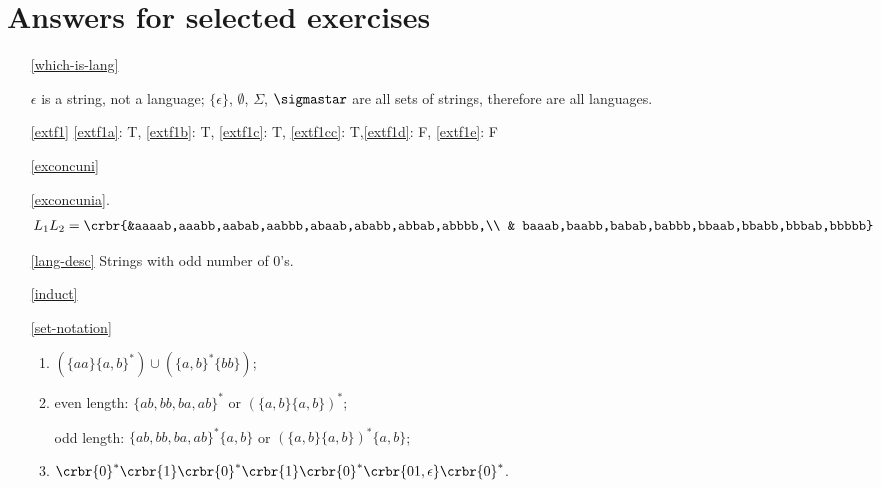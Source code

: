 \documentclass[11pt]{article}
\newcommand{\emptystring}{\ensuremath{\epsilon}}
\begin{document}
\section{Answers for selected exercises}
\begin{itemize}

\item[\ref{which-is-lang}] 

$\emptystring$ is a string, not a language; $\{\emptystring\}$,
$\emptyset$, $\Sigma$, $\sigmastar$ are all
sets of strings, therefore are all languages. 

\item[\ref{extf1}]\hypertarget{extf1sol}{} \ref{extf1a}: T, \ref{extf1b}: T, \ref{extf1c}: T, \ref{extf1cc}: T,\ref{extf1d}: F, \ref{extf1e}: F

\item[\ref{exconcuni}]\hypertarget{exconcunisol}{}

\ref{exconcunia}.
\begin{align*}
L_1L_2= \crbr{&aaaab,aaabb,aabab,aabbb,abaab,ababb,abbab,abbbb,\\
& baaab,baabb,babab,babbb,bbaab,bbabb,bbbab,bbbbb}
\end{align*}



\item[\ref{lang-desc}] Strings with odd number of 0's. 

\item[\ref{induct}]


\item[\ref{set-notation}]
\begin{enumerate}
\item  $(\{aa\}\{a,b\}^*)\cup(\{a,b\}^*\{bb\})$;


\item even length:
$\{ab,bb,ba,ab\}^*$ or $(\{a,b\}\{a,b\})^*$;

odd length:
$\{ab,bb,ba,ab\}^*\{a,b\}$ or $(\{a,b\}\{a,b\})^*\{a,b\}$;


\item $\crbr{0}^*\crbr{1}\crbr{0}^*\crbr{1}\crbr{0}^*\crbr{01,\epsilon}\crbr{0}^*$.


\end{enumerate}
\end{itemize}
\end{document}
